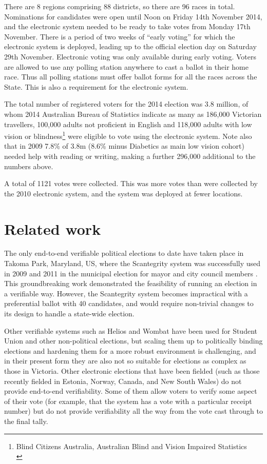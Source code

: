 \documentclass[twocolumn]{article}
\begin{document}
There are 8 regions comprising 88 districts, so there are 96 races in total.  Nominations for candidates were open until Noon on Friday 14th November 2014, and the electronic system needed to be ready to take votes from Monday 17th November.  There is a period of two weeks of ``early voting'' for which the electronic system is deployed, leading up to the official election day on Saturday 29th November.  Electronic voting was only available during early voting.   Voters are allowed to use any polling station anywhere to cast a ballot in their home race.  Thus all polling stations must offer ballot forms for all the races across the State.  This is also a requirement for the electronic system.

The total number of registered voters for the 2014
election was 3.8 million, of whom 2014 Australian Bureau of Statistics
\cite{abs} indicate as many as 186,000 Victorian travellers,
100,000 adults not proficient in English
and 118,000 adults with low vision or blindness\footnote{Blind Citizens Australia, Australian Blind and Vision Impaired Statistics\\
} were eligible to vote using the electronic system.  Note also that in 2009 7.8\% of 3.8m (8.6\% minus Diabetics as main low vision cohort) needed help with reading or writing, making a further 296,000 additional to the numbers above.

A total of 1121 votes were collected.   This was more votes than were collected by the 2010 electronic system, and the system was deployed at fewer locations.






\section{Related work}

The only end-to-end verifiable political elections to date have taken place in Takoma Park, Maryland, US, where the Scantegrity system was successfully used in 2009 and 2011 in the municipal election for mayor and city council members \cite{SIITakPk}.   This groundbreaking work demonstrated the feasibility of running an election in a verifiable way.  However, the Scantegrity system becomes impractical with a preferential ballot with 40 candidates, and would require non-trivial changes to its design to handle a state-wide election.

Other verifiable systems such as Helios \cite{DBLP:conf/uss/Adida08} and Wombat \cite{wombat2} have been used for Student Union and other non-political elections, but scaling them up to politically binding elections and hardening them for a more robust environment is challenging, and in their present form they are also not so suitable for elections as complex as those in Victoria.  Other electronic elections that have been fielded (such as those recently fielded in Estonia, Norway, Canada, and New South Wales) do not provide end-to-end verifiability.  Some of them allow voters to verify some aspect of their vote (for example, that the system has a vote with a particular receipt number) but do not provide verifiability all the way from the vote cast through to the final tally.
\end{document}
